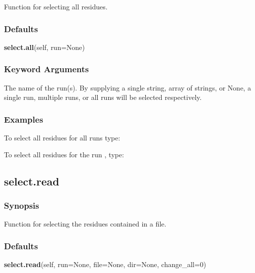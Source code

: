  Function for selecting all residues. 
  

  
 \subsubsection{Defaults} 

 \textsf{\textbf{select.all}(self, run=None)} 

  
 \subsubsection{Keyword Arguments} 

   The name of the run(s).  By supplying a single string, array of strings, or None, a single run, multiple runs, or all runs will be selected respectively.  

  

  
 \subsubsection{Examples} 

 To select all residues for all runs type: 
  


 To select all residues for the run , type: 
  



  

 \newpage 

 \subsection{select.read} 

  
 \subsubsection{Synopsis} 

 Function for selecting the residues contained in a file. 
  

  
 \subsubsection{Defaults} 

 \textsf{\textbf{select.read}(self, run=None, file=None, dir=None, change\_all=0)} 

